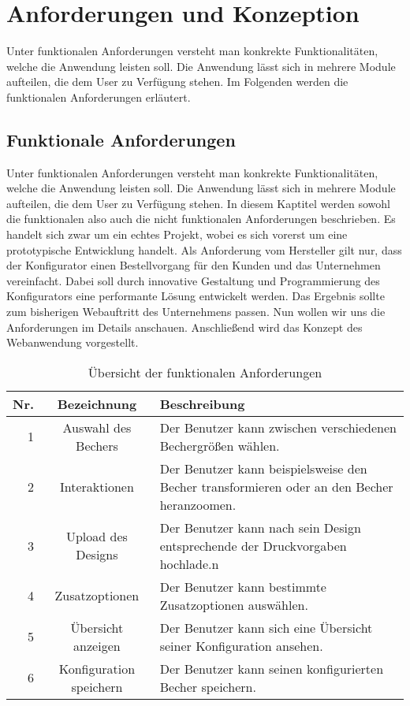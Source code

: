 %
%
%
\chapter{Anforderungen und Konzeption}
\label{cha:methodik}
%
Unter funktionalen Anforderungen versteht man konkrekte Funktionalitäten, welche die Anwendung leisten soll. Die Anwendung lässt sich in mehrere Module aufteilen, die dem User zu Verfügung stehen. Im Folgenden werden die funktionalen Anforderungen erläutert.
%
%
%
%
\section{Funktionale Anforderungen}
\label{sec:problemanalyse}
%
Unter funktionalen Anforderungen versteht man konkrekte Funktionalitäten, welche die Anwendung leisten soll. Die Anwendung lässt sich in mehrere Module aufteilen, die dem User zu Verfügung stehen. In diesem Kaptitel werden sowohl die funktionalen also auch die nicht funktionalen Anforderungen beschrieben. Es handelt sich zwar um ein echtes Projekt, wobei es sich vorerst um eine prototypische Entwicklung handelt. Als Anforderung vom Hersteller gilt nur, dass der Konfigurator einen Bestellvorgang für den Kunden und das Unternehmen vereinfacht. Dabei soll durch innovative Gestaltung und Programmierung des Konfigurators eine performante Lösung entwickelt werden. Das Ergebnis sollte zum bisherigen Webauftritt des Unternehmens passen. Nun wollen wir uns die Anforderungen im Details anschauen. Anschließend wird das Konzept des Webanwendung vorgestellt.

\renewcommand{\arraystretch}{1.8}
\begin{table}[h]
	\begin{tabular}{|r|c|p{8.5cm}|}
		\hline
		\textbf{Nr.} & \textbf{Bezeichnung} & \textbf{Beschreibung} \\
		\hline
		1 & Auswahl des Bechers & Der Benutzer kann zwischen verschiedenen Bechergrößen wählen. \\
		\hline
		2 & Interaktionen & Der Benutzer kann beispielsweise den Becher transformieren oder an den Becher heranzoomen. \\
		\hline
		3 & Upload des Designs & Der Benutzer kann nach sein Design entsprechende der Druckvorgaben hochlade.n \\
		\hline
		4 & Zusatzoptionen & Der Benutzer kann bestimmte Zusatzoptionen auswählen. \\
		\hline
		5 & Übersicht anzeigen & Der Benutzer kann sich eine Übersicht seiner Konfiguration ansehen. \\
		\hline
		6 & Konfiguration speichern & Der Benutzer kann seinen konfigurierten Becher speichern. \\
		\hline
	\end{tabular}
\caption{Übersicht der funktionalen Anforderungen}
\end{table}
%

